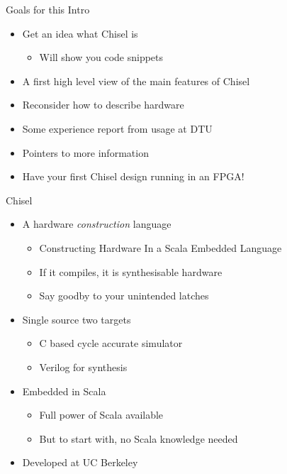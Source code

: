 \documentclass[xcolor=pdflatex,dvipsnames,table]{beamer}
\begin{document}
\begin{frame}[fragile]{Goals for this Intro}
\begin{itemize}
\item Get an idea what Chisel is
\begin{itemize}
\item Will show you code snippets
\end{itemize}
\item A first high level view of the main features of Chisel
\item Reconsider how to describe hardware
\item Some experience report from usage at DTU
\item Pointers to more information
\item Have your first Chisel design running in an FPGA!
\end{itemize}
\end{frame}

%
%
%
%

\begin{frame}[fragile]{Chisel}
\begin{itemize}
\item A hardware \emph{construction} language
\begin{itemize}
\item Constructing Hardware In a Scala Embedded Language
\item If it compiles, it is synthesisable hardware 
\item Say goodby to your unintended latches
\end{itemize}
\item Single source two targets
\begin{itemize}
\item C based cycle accurate simulator
\item Verilog for synthesis
\end{itemize}
\item Embedded in Scala
\begin{itemize}
\item Full power of Scala available
\item But to start with, no Scala knowledge needed
\end{itemize}
\item Developed at UC Berkeley
\end{itemize}
\end{frame}
\end{document}
